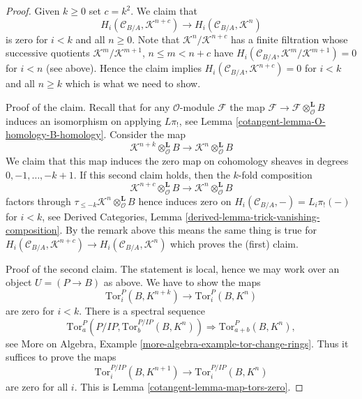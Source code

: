 \begin{proof}
\medskip\noindent
Given $k \geq 0$ set $c = k^2$. We claim that
$$
H_i(\mathcal{C}_{B/A}, \mathcal{K}^{n + c}) \to
H_i(\mathcal{C}_{B/A}, \mathcal{K}^n)
$$
is zero for $i < k$ and all $n \geq 0$. Note that
$\mathcal{K}^n/\mathcal{K}^{n + c}$ has a finite filtration whose successive
quotients $\mathcal{K}^m/\mathcal{K}^{m + 1}$, $n \leq m < n + c$
have $H_i(\mathcal{C}_{B/A}, \mathcal{K}^m/\mathcal{K}^{m + 1}) = 0$
for $i < n$ (see above). Hence the claim implies
$H_i(\mathcal{C}_{B/A}, \mathcal{K}^{n + c}) = 0$ for $i < k$ and all
$n \geq k$ which is what we need to show.

\medskip\noindent
Proof of the claim. Recall that for any $\mathcal{O}$-module $\mathcal{F}$
the map $\mathcal{F} \to \mathcal{F} \otimes_\mathcal{O}^\mathbf{L} B$
induces an isomorphism on applying $L\pi_!$, see
Lemma \ref{cotangent-lemma-O-homology-B-homology}.
Consider the map
$$
\mathcal{K}^{n + k} \otimes_\mathcal{O}^\mathbf{L} B
\longrightarrow
\mathcal{K}^n \otimes_\mathcal{O}^\mathbf{L} B
$$
We claim that this map induces the zero map on cohomology sheaves
in degrees $0, -1, \ldots, - k + 1$. If this second claim holds, then
the $k$-fold composition
$$
\mathcal{K}^{n + c} \otimes_\mathcal{O}^\mathbf{L} B
\longrightarrow
\mathcal{K}^n \otimes_\mathcal{O}^\mathbf{L} B
$$
factors through $\tau_{\leq -k}\mathcal{K}^n \otimes_\mathcal{O}^\mathbf{L} B$
hence induces zero on $H_i(\mathcal{C}_{B/A}, -) = L_i\pi_!( - )$
for $i < k$, see
Derived Categories, Lemma \ref{derived-lemma-trick-vanishing-composition}.
By the remark above this means the same thing is true for
$H_i(\mathcal{C}_{B/A}, \mathcal{K}^{n + c}) \to
H_i(\mathcal{C}_{B/A}, \mathcal{K}^n)$
which proves the (first) claim.

\medskip\noindent
Proof of the second claim. The statement is local, hence we may work
over an object $U = (P \to B)$ as above. We have to show
the maps
$$
\text{Tor}_i^P(B, K^{n + k}) \to \text{Tor}_i^P(B, K^n)
$$
are zero for $i < k$. There is a spectral sequence
$$
\text{Tor}_a^P(P/IP, \text{Tor}_b^{P/IP}(B, K^n))
\Rightarrow
\text{Tor}_{a + b}^P(B, K^n),
$$
see More on Algebra, Example \ref{more-algebra-example-tor-change-rings}.
Thus it suffices to prove the maps
$$
\text{Tor}_i^{P/IP}(B, K^{n + 1}) \to \text{Tor}_i^{P/IP}(B, K^n)
$$
are zero for all $i$. This is Lemma \ref{cotangent-lemma-map-tors-zero}.
\end{proof}


